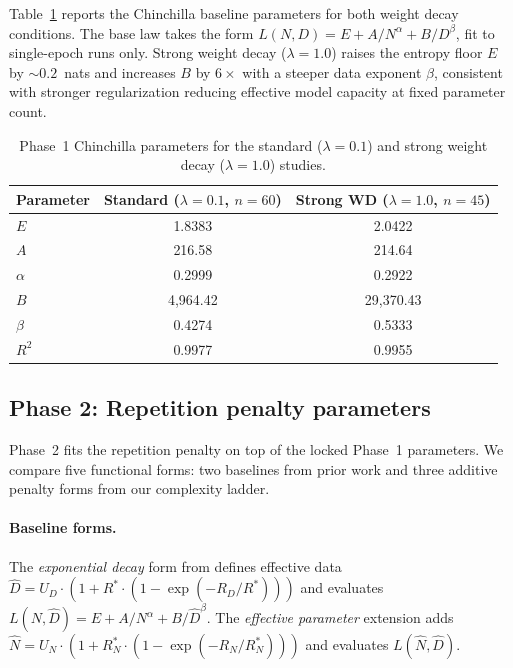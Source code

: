Table~\ref{tab:chinchilla_params} reports the Chinchilla baseline parameters for both weight decay conditions.
The base law takes the form $L(N, D) = E + A / N^\alpha + B / D^\beta$, fit to single-epoch runs only.
Strong weight decay ($\lambda = 1.0$) raises the entropy floor $E$ by ${\sim}0.2$~nats and increases $B$ by $6\times$ with a steeper data exponent $\beta$, consistent with stronger regularization reducing effective model capacity at fixed parameter count.

\begin{table}[t]
\centering
\caption{Phase~1 Chinchilla parameters for the standard ($\lambda = 0.1$) and strong weight decay ($\lambda = 1.0$) studies.}
\label{tab:chinchilla_params}
\begin{tabular}{lcc}
\toprule
Parameter & Standard ($\lambda = 0.1$, $n = 60$) & Strong WD ($\lambda = 1.0$, $n = 45$) \\
\midrule
$E$      & 1.8383      & 2.0422 \\
$A$      & 216.58      & 214.64 \\
$\alpha$ & 0.2999      & 0.2922 \\
$B$      & 4,964.42    & 29,370.43 \\
$\beta$  & 0.4274      & 0.5333 \\
\midrule
$R^2$    & 0.9977      & 0.9955 \\
\bottomrule
\end{tabular}
\end{table}

\subsection{Phase 2: Repetition penalty parameters}

Phase~2 fits the repetition penalty on top of the locked Phase~1 parameters.
We compare five functional forms: two baselines from prior work and three additive penalty forms from our complexity ladder.

\paragraph{Baseline forms.}
The \emph{exponential decay} form from \citet{muennighoff2023scaling} defines effective data $\widehat{D} = U_D \cdot (1 + R^* \cdot (1 - \exp(-R_D / R^*)))$ and evaluates $L(N, \widehat{D}) = E + A/N^\alpha + B/{\widehat{D}}^\beta$.
The \emph{effective parameter} extension adds $\widehat{N} = U_N \cdot (1 + R^*_N \cdot (1 - \exp(-R_N / R^*_N)))$ and evaluates $L(\widehat{N}, \widehat{D})$.

